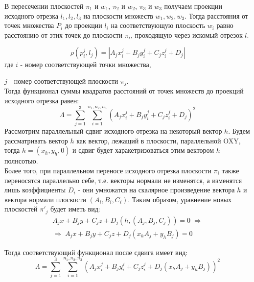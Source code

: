 В пересечении плоскостей $\pi_1$ и $w_1$, $\pi_2$ и $w_2$, $\pi_3$ и $w_3$ получаем проекции исходного отрезка $l_1, l_2, l_3$ на плоскости множеств $w_1, w_2, w_3$. Тогда расстояния от точек множества $P_i$ до проекции $l_i$ на соответствующую плоскость $w_i$ равно расстоянию от этих точек до плоскости $\pi_i$, проходящую через искомый отрезок $l$.

$$\rho (p_i^j, l_j) = |A_j x_i^j + B_j y_i^j + C_j z_i^j + D_j|$$
где $i$ - номер соответствующей точки множества,

$j$ - номер соответствующей плоскости $\pi_j$.\\

Тогда функционал суммы квадратов расстояний от точек множеств до проекций исходного отрезка равен:
$$\Lambda = \underset{j=1}{\overset{3}{\sum}}\underset{i=1}{\overset{n_1, n_2, n_3}{\sum}}(A_j x_i^j + B_j y_i^j + C_j z_i^j + D_j)^2$$
\newpage
Рассмотрим параллельный сдвиг исходного отрезка на некоторый вектор $h$. Будем рассматривать вектор $h$ как вектор, лежащий в плоскости, параллельной OXY, тогда $h = (x_h, y_h, 0)$ и сдвиг будет харакетризоваться этим вектором $h$ полнсотью.\\

Более того, при параллельном переносе исходного отрезка плоскости $\pi_i$ также переносятся параллельно себе, т.е. векторы нормали не изменятся, а изменятся лишь коэффициенты $D_i$ - они умножатся на скалярное произведение вектора $h$ и вектора нормали плоскости $(A_i, B_i, C_i)$. Таким образом, уравнение новых плоскостей $\pi'_j$ будет иметь вид:
$$\begin{gathered}
	A_j x + B_j y + C_j z + D_j \left(h, (A_j, B_j, C_j) \right) = 0 \; \Rightarrow \\
	\Rightarrow \; A_j x + B_j y + C_j z + D_j (x_h A_j + y_h B_j) = 0
\end{gathered}$$

Тогда соответствующий функционал после сдвига имеет вид:
$$\Lambda = \underset{j=1}{\overset{3}{\sum}}\underset{i=1}{\overset{n_1, n_2, n_3}{\sum}}\left(A_j x_i^j + B_j y_i^j + C_j z_i^j + D_j(x_h A_j + y_h B_j)\right)^2$$

